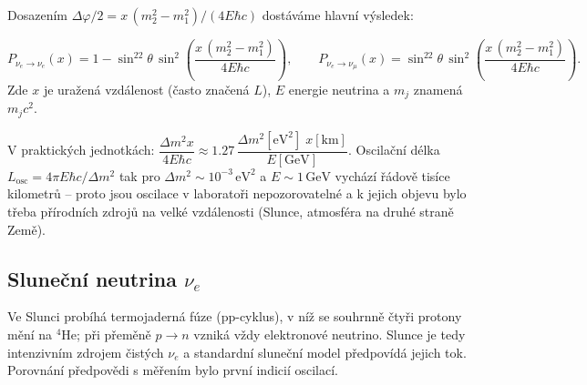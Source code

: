 Dosazením \(\Delta\varphi/2=x\,(m_2^2-m_1^2)/(4E\hbar c)\) dostáváme hlavní výsledek:
\begin{veta}
\[
  P_{\nu_e\to\nu_e}(x)=1-\sin^22\theta\,\sin^2\!\left(\frac{x\,(m_2^2-m_1^2)}{4E\hbar c}\right),\qquad
  P_{\nu_e\to\nu_\mu}(x)=\sin^22\theta\,\sin^2\!\left(\frac{x\,(m_2^2-m_1^2)}{4E\hbar c}\right).
\]
Zde \(x\) je uražená vzdálenost (často značená \(L\)), \(E\) energie neutrina a \(m_j\) znamená \(m_jc^2\).
\end{veta}
V praktických jednotkách: \(\dfrac{\Delta m^2 x}{4E\hbar c}\approx1.27\,\dfrac{\Delta m^2[\mathrm{eV^2}]\;x[\mathrm{km}]}{E[\mathrm{GeV}]}\). Oscilační délka \(L_{\mathrm{osc}}=4\pi E\hbar c/\Delta m^2\) tak pro \(\Delta m^2\sim10^{-3}\,\mathrm{eV^2}\) a \(E\sim1\,\mathrm{GeV}\) vychází řádově tisíce kilometrů -- proto jsou oscilace v laboratoři nepozorovatelné a k jejich objevu bylo třeba přírodních zdrojů na velké vzdálenosti (Slunce, atmosféra na druhé straně Země).

\subsection{Sluneční neutrina \texorpdfstring{\(\nu_e\)}{nu\_e}}

Ve Slunci probíhá termojaderná fúze (pp-cyklus), v níž se souhrnně čtyři protony mění na \(^4\)He; při přeměně \(p\to n\) vzniká vždy elektronové neutrino. Slunce je tedy intenzivním zdrojem čistých \(\nu_e\) a standardní sluneční model předpovídá jejich tok. Porovnání předpovědi s měřením bylo první indicií oscilací.

